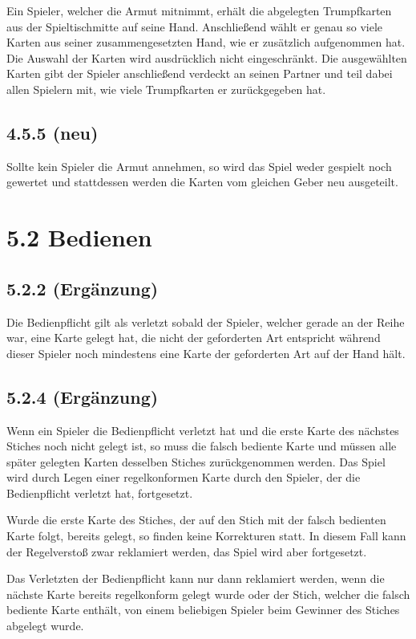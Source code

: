Ein Spieler, welcher die Armut mitnimmt, erhält die abgelegten
Trumpfkarten aus der Spieltischmitte auf seine Hand. Anschließend
wählt er genau so viele Karten aus seiner zusammengesetzten Hand, wie
er zusätzlich aufgenommen hat. Die Auswahl der Karten wird
ausdrücklich nicht eingeschränkt. Die ausgewählten Karten gibt der
Spieler anschließend verdeckt an seinen Partner und teil dabei allen
Spielern mit, wie viele Trumpfkarten er zurückgegeben hat.

\subsection*{4.5.5 (neu)}

Sollte kein Spieler die Armut annehmen, so wird das Spiel weder gespielt
noch gewertet und stattdessen werden die Karten vom gleichen Geber neu
ausgeteilt.

\section*{5.2 Bedienen}

\subsection*{5.2.2 (Ergänzung)}

Die Bedienpflicht gilt als verletzt sobald der Spieler, welcher gerade an der
Reihe war, eine Karte gelegt hat, die nicht der geforderten Art entspricht
während dieser Spieler noch mindestens eine Karte der geforderten Art auf der
Hand hält.

\subsection*{5.2.4 (Ergänzung)}

Wenn ein Spieler die Bedienpflicht verletzt hat und die erste Karte des nächstes
Stiches noch nicht gelegt ist, so muss die falsch bediente Karte und müssen alle
später gelegten Karten desselben Stiches zurückgenommen werden. Das Spiel wird
durch Legen einer regelkonformen Karte durch den Spieler, der die Bedienpflicht
verletzt hat, fortgesetzt.

Wurde die erste Karte des Stiches, der auf den Stich mit der falsch bedienten
Karte folgt, bereits gelegt, so finden keine Korrekturen statt. In diesem Fall
kann der Regelverstoß zwar reklamiert werden, das Spiel wird aber fortgesetzt.

Das Verletzten der Bedienpflicht kann nur dann reklamiert werden, wenn die
nächste Karte bereits regelkonform gelegt wurde oder der Stich, welcher die
falsch bediente Karte enthält, von einem beliebigen Spieler beim Gewinner des
Stiches abgelegt wurde.

